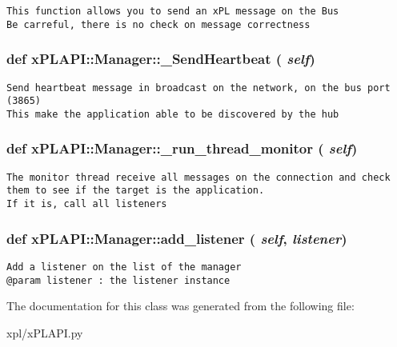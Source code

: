 \footnotesize\begin{verbatim}
This function allows you to send an xPL message on the Bus
Be carreful, there is no check on message correctness
\end{verbatim}
\normalsize
 \hypertarget{classxPLAPI_1_1Manager_c4032a0074505d88356fbc04468ca01c}{
\subsubsection[\_\-SendHeartbeat]{\setlength{\rightskip}{0pt plus 5cm}def xPLAPI::Manager::\_\-SendHeartbeat ( {\em self})}}
\label{classxPLAPI_1_1Manager_c4032a0074505d88356fbc04468ca01c}




\footnotesize\begin{verbatim}
Send heartbeat message in broadcast on the network, on the bus port (3865)
This make the application able to be discovered by the hub
\end{verbatim}
\normalsize
 \hypertarget{classxPLAPI_1_1Manager_f3b6bb58d65bbacf144099c29389481b}{
\subsubsection[\_\-run\_\-thread\_\-monitor]{\setlength{\rightskip}{0pt plus 5cm}def xPLAPI::Manager::\_\-run\_\-thread\_\-monitor ( {\em self})}}
\label{classxPLAPI_1_1Manager_f3b6bb58d65bbacf144099c29389481b}




\footnotesize\begin{verbatim}
The monitor thread receive all messages on the connection and check
them to see if the target is the application.
If it is, call all listeners
\end{verbatim}
\normalsize
 \hypertarget{classxPLAPI_1_1Manager_e40b7a76258786cbf63ae2374b28c053}{
\subsubsection[add\_\-listener]{\setlength{\rightskip}{0pt plus 5cm}def xPLAPI::Manager::add\_\-listener ( {\em self}, \/   {\em listener})}}
\label{classxPLAPI_1_1Manager_e40b7a76258786cbf63ae2374b28c053}




\footnotesize\begin{verbatim}
Add a listener on the list of the manager
@param listener : the listener instance
\end{verbatim}
\normalsize
 

The documentation for this class was generated from the following file:\begin{CompactItemize}
\item 
xpl/xPLAPI.py\end{CompactItemize}
